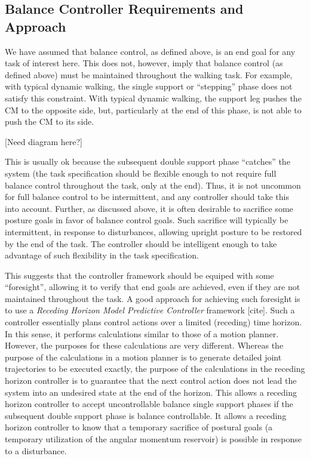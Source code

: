 \documentclass{llncs}
\begin{document}
\subsection{Balance Controller Requirements and Approach}

We have assumed that balance control, as defined above, is an end goal for any task of interest here.
This does not, however, imply that balance control (as defined above) must be maintained throughout the
walking task.
For example, with typical dynamic walking, the single support or ``stepping'' phase does not satisfy this constraint.
With typical dynamic walking, the support leg pushes the CM to the opposite side, but, particularly at the end of this phase,
is not able to push the CM to its side.

[Need diagram here?]

This is usually ok because the subsequent double support phase ``catches'' the system
(the task specification should be flexible enough to not require full balance control throughout the task, only at the end).
Thus, it is not uncommon for full balance control to be intermittent, and any controller should take this into account.
Further, as discussed above, it is often desirable to sacrifice some posture goals in favor of balance control goals.
Such sacrifice will typically be intermittent, in response to disturbances, allowing upright posture to be restored
by the end of the task.
The controller should be intelligent enough to take advantage of such flexibility in the task specification.

This suggests that the controller framework should be equiped with some ``foresight'', allowing it to verify that end
goals are achieved, even if they are not maintained throughout the task.
A good approach for achieving such foresight is to use a \textit{Receding Horizon Model Predictive Controller} framework [cite].
Such a controller essentially plans control actions over a limited (receding) time horizon.
In this sense, it performs calculations similar to those of a motion planner.
However, the purposes for these calculations are very different.
Whereas the purpose of the calculations in a motion planner is to generate detailed joint trajectories to be executed exactly, 
the purpose of the calculations in the receding horizon controller is to guarantee that the next control action does not
lead the system into an undesired state at the end of the horizon.
This allows a receding horizon controller to accept uncontrollable balance single support phases if the subsequent double support
phase is balance controllable.
It allows a receding horizon controller to know that a temporary sacrifice of postural goals (a temporary utilization of the 
angular momentum reservoir) is possible in response to a disturbance.
\end{document}
